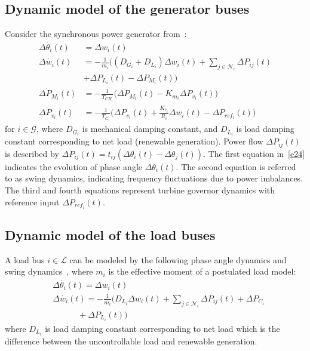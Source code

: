 \documentclass[journal]{IEEEtran}
\newcommand{\nnum}{\nonumber}
\newcommand{\GG}{{\mathcal{G}}}
\newcommand{\LL}{{\mathcal{L}}}
\newcommand{\NN}{{\mathcal{N}}}
\begin{document}
\subsection{Dynamic model of the generator buses}\label{sec:gen0}
Consider the synchronous power generator from~\cite{Wood:1996}:
\begin{align}
\Delta\dot{\theta_i}(t) &= \Delta w_i(t)\nnum\\
\Delta\dot{w_i}(t) &= -\frac{1}{m_i}\big((D_{G_i}+D_{L_i}) \Delta w_i(t) + \sum_{j\in{{\NN}}_i} \Delta P_{ij}(t) \nnum\\
&+\Delta P_{L_i}(t)- \Delta P_{M_i}(t)\big)\nnum\\
\Delta\dot{P}_{M_i}(t) &= -\frac{1}{T_{{CH}_i}}\big(\Delta P_{M_i}(t) - K_{m_i}\Delta P_{v_i}(t)\big)\nnum\\
\Delta\dot{P}_{v_i}(t) &= -\frac{1}{T_{G_i}}\big(\Delta P_{v_i}(t) + \frac{K_{e_i}}{R_i} \Delta w_i(t) - \Delta P_{{ref}_i}(t)\big)
\label{e24}
\end{align}
for $i \in {\GG}$, where $D_{G_i}$ is mechanical damping constant, and $D_{L_i}$ is load damping constant corresponding to net load (renewable generation).
Power flow $\Delta P_{ij}(t)$ is described by $\Delta P_{ij}(t) = t_{ij}(\Delta \theta_i(t) - \Delta \theta_j(t))$.
The first equation in~\eqref{e24} indicates the evolution of phase angle $\Delta \theta_i(t)$.
The second equation is referred to as swing dynamics, indicating frequency fluctuations due to power imbalances.
The third and fourth equations represent turbine governor dynamics with reference input $\Delta P_{ref_i}(t)$.


\subsection{Dynamic model of the load buses}
A load bus $i\in {\LL}$ can be modeled by the following phase angle dynamics and swing dynamics~\cite{ilic2010modeling}, where $m_i$ is the effective moment of a postulated load model:
\begin{align}
&\Delta\dot{\theta_i}(t) = \Delta w_i(t)\nnum\\
&\Delta\dot{w_i}(t) = -\frac{1}{m_i}\big(D_{L_i} \Delta w_i(t) + \sum_{j \in \NN_i}\Delta P_{ij}(t) + \Delta P_{{C}_i} \nnum\\
&\quad \quad \quad +\Delta P_{{L}_i}(t)\big)
\label{eq_load}
\end{align}
where $D_{L_i}$ is load damping constant corresponding to net load which is the difference between the uncontrollable load and renewable generation.
\end{document}
